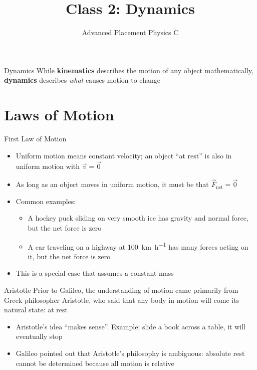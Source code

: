 \documentclass[12pt,compress,aspectratio=169]{beamer}
\title{Class 2: Dynamics}
\subtitle{Advanced Placement Physics C}
\begin{document}
\begin{frame}
  \maketitle
\end{frame}



\begin{frame}{Dynamics}
  While \textbf{kinematics} describes the motion of any object mathematically,
  \textbf{dynamics} describes \emph{what} causes motion to change
\end{frame}



\section{Laws of Motion}

\begin{frame}{First Law of Motion}
  \begin{center}
  \end{center}
  \begin{itemize}
  \item Uniform motion means constant velocity; an object ``at rest'' is also
    in uniform motion with $\vec v=\vec 0$
  \item As long as an object moves in uniform motion, it must be that
    $\vec F_\text{net}=\vec 0$
  \item Common examples:
    \begin{itemize}
    \item A hockey puck sliding on very smooth ice has gravity and normal
      force, but the net force is zero
    \item A car traveling on a highway at \SI{100}{\kilo\metre\per\hour}
      has many forces acting on it, but the net force is zero 
    \end{itemize}
  \item{\color{red!80!black}This is a special case that assumes a constant
    mass}
  \end{itemize}
\end{frame}

\begin{frame}{Aristotle}
  Prior to Galileo, the understanding of motion came primarily from Greek
  philosopher Aristotle, who said that any body in motion will come its
  natural state: at rest
  \begin{itemize}
  \item Aristotle's idea ``makes sense''. Example: slide a book across a table,
    it will eventually stop
  \item Galileo pointed out that Aristotle's philosophy is ambiguous: absolute
    rest cannot be determined because all motion is relative
  \end{itemize}
\end{frame}
\end{document}
